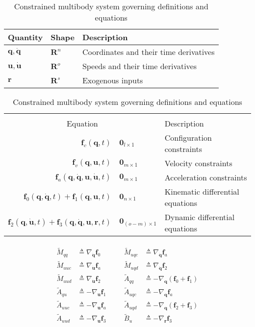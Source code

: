 \documentclass[smallcondensed]{svjour3}                     %
\begin{document}
\begin{table}[htbp]
  \centering
  \caption{Constrained multibody system governing definitions and equations}
  \label{table:assumptions}
  \begin{tabular}[c]{l l l}
    Quantity & Shape & Description\\
    \hline
    $\bm{q},\bm{\dot{q}}$ & $\mathbf{R}^n$ & Coordinates and their time
    derivatives\\
    $\bm{u}, \bm{\dot{u}}$ & $\mathbf{R}^o$ & Speeds and their time derivatives\\
    $\bm{r}$ & $\mathbf{R}^s$ & Exogenous inputs \\
  \end{tabular}
  \begin{tabular}[c]{r @{ $=$ } l l}
    \multicolumn{3}{c}{ } \\
    \multicolumn{2}{c}{Equation} & Description \\
    \hline
    $\bm{f}_{c}(\bm{q}, t)$ & $\bm{0}_{l \times 1}$ & Configuration constraints \\
    $\bm{f}_{v}(\bm{q}, \bm{u}, t)$ & $\bm{0}_{m \times 1}$ & Velocity constraints \\
    $\bm{f}_{a}(\bm{q}, \bm{\dot{q}}, \bm{u}, \bm{\dot{u}}, t)$ & $\bm{0}_{m
    \times 1}$ & Acceleration constraints \\
    $\bm{f}_{0}(\bm{q}, \bm{\dot{q}}, t) + \bm{f}_{1}(\bm{q}, \bm{u}, t)$ &
    $\bm{0}_{n \times 1}$ & Kinematic differential equations \\
    $\bm{f}_{2}(\bm{q}, \bm{\dot{u}}, t) + \bm{f}_{3}(\bm{q}, \bm{\dot{q}},
    \bm{u}, \bm{r}, t)$ & $\bm{0}_{(o - m) \times 1}$ & Dynamic differential equations
  \end{tabular}
\end{table}

\begin{align}
\label{eq:quant_to_compute}
  \begin{array}{llcll}
    \tilde{M}_{qq}  &\triangleq \nabla_{\bm{\dot{q}}}\bm{f}_0 & \quad &
    \tilde{M}_{uqc} &\triangleq \nabla_{\bm{\dot{q}}}\bm{f}_a \\
    \tilde{M}_{uuc} &\triangleq \nabla_{\bm{\dot{u}}}\bm{f}_a & \quad &
    \tilde{M}_{uqd} &\triangleq \nabla_{\bm{\dot{q}}}\bm{f}_2 \\
    \tilde{M}_{uud} &\triangleq \nabla_{\bm{\dot{u}}}\bm{f}_2 & \quad &
    \tilde{A}_{qq}  &\triangleq -\nabla_{\bm{q}}(\bm{f}_0 + \bm{f}_1) \\
    \tilde{A}_{qu}  &\triangleq -\nabla_{\bm{u}}\bm{f}_1 & \quad &
    \tilde{A}_{uqc} &\triangleq - \nabla_{\bm{q}} \bm{f}_a \\
    \tilde{A}_{uuc} &\triangleq - \nabla_{\bm{u}} \bm{f}_a & \quad &
    \tilde{A}_{uqd} &\triangleq - \nabla_{\bm{q}} (\bm{f}_2 + \bm{f}_3) \\
    \tilde{A}_{uud} &\triangleq - \nabla_{\bm{u}} \bm{f}_3 & \quad &
    \tilde{B}_{u}   &\triangleq -\nabla_{\bm{r}}\bm{f}_{3}
  \end{array}
\end{align}
\end{document}
